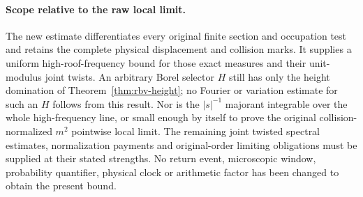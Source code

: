 \paragraph{Scope relative to the raw local limit.}
The new estimate differentiates every original finite section and
occupation test and retains the complete physical displacement and
collision marks. It supplies a uniform high-roof-frequency bound
for those exact measures and their unit-modulus joint twists. An
arbitrary Borel selector $H$ still has only the height domination of
Theorem~\ref{thm:rbv-height}; no Fourier or variation estimate for
such an $H$ follows from this result. Nor is the $|s|^{-1}$ majorant
integrable over the whole high-frequency line, or small enough by
itself to prove the original collision-normalized $m^2$ pointwise
local limit. The remaining joint twisted spectral estimates,
normalization payments and original-order limiting obligations must
be supplied at their stated strengths. No return event, microscopic
window, probability quantifier, physical clock or arithmetic factor
has been changed to obtain the present bound.
